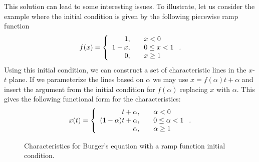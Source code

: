 This solution can lead to some interesting issues. To illustrate, let us consider the example where the initial condition is given by the following piecewise ramp function
\begin{align}
  f(x) = \left\{ \begin{array}{r l} 
  1, & \quad x < 0 \\
  1 - x, & \quad 0 \le x < 1 \\
  0, & \quad x \ge 1 \\ \end{array} \right. . 
\end{align}
Using this initial condition, we can construct a set of characteristic lines in the $x$-$t$ plane. If we parameterize the lines based on $\alpha$ we may use $x = f(\alpha) t + \alpha$ and insert the argument from the initial condition for $f(\alpha)$ replacing $x$ with $\alpha$. This gives the following functional form for the characteristics:
\begin{align}
  x(t) = \left\{ \begin{array}{r l} 
  t + \alpha, & \quad \alpha < 0 \\
  (1 - \alpha) t + \alpha, & \quad 0 \le \alpha < 1 \\
  \alpha, & \quad \alpha \ge 1 \\ \end{array} \right. . 
\end{align}

\begin{figure}[tb!]
\begin{center}
\caption{Characteristics for Burger's equation with a ramp function initial condition.}
\label{Fig:pde_burgerEquationCharacteristics_RampFunction}
\end{center}
\end{figure}

